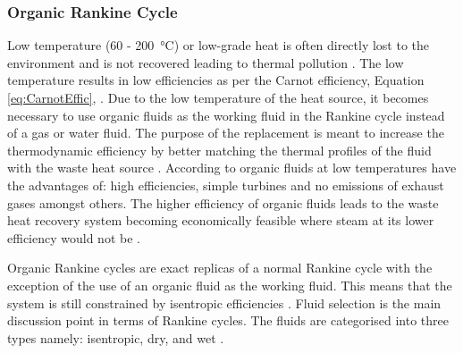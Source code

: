 \documentclass[a4paper,12pt]{article}
\begin{document}
\subsubsection{Organic Rankine Cycle}
Low temperature (60 - \SI{200}{\celsius}) or low-grade heat is often directly lost to the environment and is not recovered leading to thermal pollution \parencite{MagoChamraSomayaji}. The low temperature results in low efficiencies as per the Carnot efficiency, Equation \ref{eq:CarnotEffic}, \parencite{RoyMishraMisra}. Due to the low temperature of the heat source, it becomes necessary to use organic fluids as the working fluid in the Rankine cycle instead of a gas or water fluid. The purpose of the replacement is meant to increase the thermodynamic efficiency by better matching the thermal profiles of the fluid with the waste heat source \parencite{MacchiEnnio}. According to \textcite{GuWengZheng} organic fluids at low temperatures have the advantages of: high efficiencies, simple turbines and no emissions of exhaust gases amongst others. The higher efficiency of organic fluids leads to the waste heat recovery system becoming economically feasible where steam at its lower efficiency would not be \parencite{MagoChamraSomayaji}.

Organic Rankine cycles are exact replicas of a normal Rankine cycle with the exception of the use of an organic fluid as the working fluid. This means that the system is still constrained by isentropic efficiencies \parencite{MacchiEnnio}. Fluid selection is the main discussion point in terms of Rankine cycles. The fluids are categorised into three types namely: isentropic, dry, and wet \parencite{GuWengZheng}.
\end{document}
